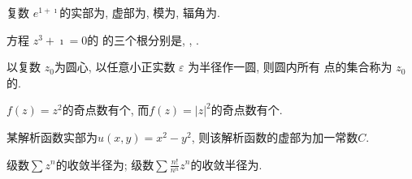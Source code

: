 \documentclass{njustexam}
\begin{document}
\renewcommand{\course}{数学物理方法}                          %
\renewcommand{\duration}{120}                                            %
\renewcommand{\credit}{5}                                                   %
\renewcommand{\syllabus}{11044102}                               %
\renewcommand{\fullmark}{100}                                            %
\renewcommand{\composer}{罗凯}            %
\renewcommand{\composedate}{\today}                   %
\renewcommand{\validator}{}                                        %
\renewcommand{\coursetype}{1}                                            %
\renewcommand{\exammethod}{1}                                         %
\renewcommand{\testpaper}{A}                                              %

\makehead %


\begin{problem}
 复数 $e^{1+\imath}$的实部为,  虚部为,  
 模为, 辐角为. 
\end{problem}


\begin{problem}
方程 $z^3 + \imath = 0$的
的三个根分别是\fillout{$\imath$}, 
, 
. 
\end{problem}


\begin{problem}
  以复数 $z_0$为圆心,  以任意小正实数 $\varepsilon$ 为半径作一圆,  则圆内所有 点的集合称为 $z_0$ 的. 
\end{problem}


\begin{problem}
$f(z)=z^2$的奇点数有个, 而$f(z)=|z|^2$的奇点数有个. 
\end{problem}


\begin{problem}
某解析函数实部为$u(x, y) = x^2 - y^2$, 则该解析函数的虚部为加一常数$C$. 
\end{problem}

\begin{problem}
  级数$\sum z^n$的收敛半径为;
  级数$\sum \frac{n !}{n^n} z^n$的收敛半径为. 
 \end{problem}
\end{document}
